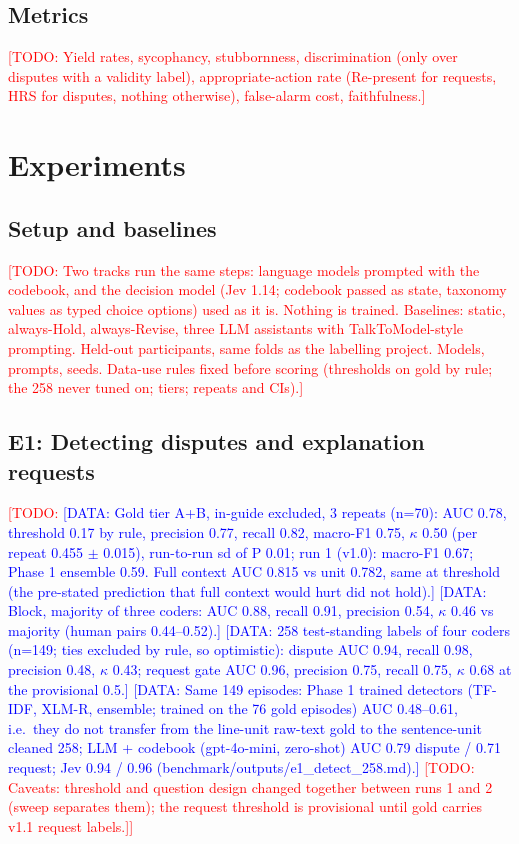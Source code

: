 \documentclass[preprint,12pt,3p,times]{elsarticle}
\newcommand{\todo}[1]{\textcolor{red}{[TODO: #1]}}
\newcommand{\done}[1]{\textcolor{blue}{[DATA: #1]}}   %
\begin{document}
\subsection{Metrics}
\todo{Yield rates, sycophancy, stubbornness, discrimination (only over disputes with a validity label), appropriate-action rate (Re-present for requests, HRS for disputes, nothing otherwise), false-alarm cost, faithfulness.}

\section{Experiments}  %
\subsection{Setup and baselines}
\todo{Two tracks run the same steps: language models prompted with the codebook, and the decision model (Jev 1.14; codebook passed as state, taxonomy values as typed choice options) used as it is. Nothing is trained. Baselines: static, always-Hold, always-Revise, three LLM assistants with TalkToModel-style prompting. Held-out participants, same folds as the labelling project. Models, prompts, seeds. Data-use rules fixed before scoring (thresholds on gold by rule; the 258 never tuned on; tiers; repeats and CIs).}
\subsection{E1: Detecting disputes and explanation requests}
\todo{\done{Gold tier A+B, in-guide excluded, 3 repeats (n=70): AUC 0.78, threshold 0.17 by rule, precision 0.77, recall 0.82, macro-F1 0.75, $\kappa$ 0.50 (per repeat 0.455 $\pm$ 0.015), run-to-run sd of P 0.01; run 1 (v1.0): macro-F1 0.67; Phase 1 ensemble 0.59. Full context AUC 0.815 vs unit 0.782, same at threshold (the pre-stated prediction that full context would hurt did not hold).} \done{Block, majority of three coders: AUC 0.88, recall 0.91, precision 0.54, $\kappa$ 0.46 vs majority (human pairs 0.44--0.52).} \done{258 test-standing labels of four coders (n=149; ties excluded by rule, so optimistic): dispute AUC 0.94, recall 0.98, precision 0.48, $\kappa$ 0.43; request gate AUC 0.96, precision 0.75, recall 0.75, $\kappa$ 0.68 at the provisional 0.5.} \done{Same 149 episodes: Phase 1 trained detectors (TF-IDF, XLM-R, ensemble; trained on the 76 gold episodes) AUC 0.48--0.61, i.e.\ they do not transfer from the line-unit raw-text gold to the sentence-unit cleaned 258; LLM + codebook (gpt-4o-mini, zero-shot) AUC 0.79 dispute / 0.71 request; Jev 0.94 / 0.96 (benchmark/outputs/e1\_detect\_258.md).} \todo{Caveats: threshold and question design changed together between runs 1 and 2 (sweep separates them); the request threshold is provisional until gold carries v1.1 request labels.}}
\end{document}

